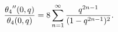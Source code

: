 \[\frac{\mathop{\theta_{4}\/}\nolimits''\!\left(0,q\right)}{\mathop{\theta_{4}\/%
}\nolimits\!\left(0,q\right)}=8\sum_{n=1}^{\infty}\frac{q^{2n-1}}{(1-q^{2n-1})%
^{2}}.\]